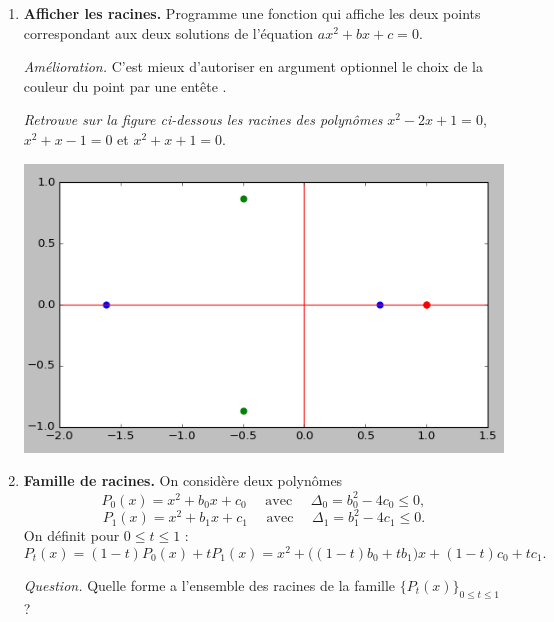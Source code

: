 \documentclass[11pt,class=report,crop=false]{standalone}
\begin{document}

\begin{activite}


\begin{enumerate}
  \item \textbf{Afficher les racines.}
  Programme une fonction  qui affiche les deux points correspondant aux deux solutions de l'équation $ax^2+bx+c=0$.
  
  \emph{Amélioration.} C'est mieux d'autoriser en argument optionnel le choix de la couleur du point par une entête .
  
  
\emph{Retrouve sur la figure ci-dessous les racines des polynômes}
$x^2 - 2x + 1 = 0$,  $x^2 + x - 1 = 0$ et $x^2 + x + 1 = 0$.
\begin{center}
\includegraphics[scale=\myscale,scale=0.4]{ecran-complexes1-5a}
\end{center}	 
  
  
  \item \textbf{Famille de racines.}
  On considère deux polynômes
  $$P_0(x) = x^2 + b_0 x + c_0 \quad \text{ avec } \quad \Delta_0 = b_0^2-4c_0 \le 0,$$
  $$P_1(x) = x^2 + b_1 x + c_1 \quad \text{ avec } \quad \Delta_1 = b_1^2-4c_1 \le 0.$$  
  On définit pour $0 \le t \le 1$ :
  $$P_t(x) = (1-t)P_0(x) + tP_1(x) = x^2 + \big((1-t)b_0 + tb_1\big) x + (1-t)c_0 + tc_1.$$
  
  \emph{Question.} Quelle forme a l'ensemble des racines de la famille 
  $\{P_t(x)\}_{0 \le t \le 1}$ ?
  

\end{enumerate}
\end{activite}
\end{document}
